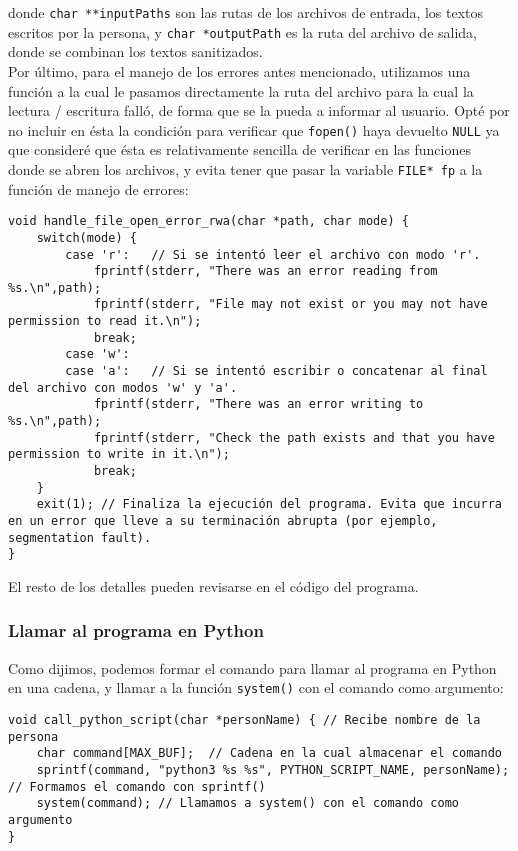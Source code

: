 \documentclass[a4paper]{article}
\begin{document}
\noindent donde \texttt{char **inputPaths} son las rutas de los archivos de entrada, los textos escritos por la persona, y \texttt{char *outputPath} es la ruta del archivo de salida, donde se combinan los textos sanitizados. \\

Por último, para el manejo de los errores antes mencionado, utilizamos una función a la cual le pasamos directamente la ruta del archivo para la cual la lectura / escritura falló, de forma que se la pueda a informar al usuario. Opté por no incluir en ésta la condición para verificar que \texttt{fopen()} haya devuelto \texttt{NULL} ya que consideré que ésta es relativamente sencilla de verificar en las funciones donde se abren los archivos, y evita tener que pasar la variable \texttt{FILE* fp} a la función de manejo de errores:

\begin{verbatim}
void handle_file_open_error_rwa(char *path, char mode) {
    switch(mode) {
        case 'r':   // Si se intentó leer el archivo con modo 'r'.
            fprintf(stderr, "There was an error reading from %s.\n",path);
            fprintf(stderr, "File may not exist or you may not have permission to read it.\n");
            break;
        case 'w':
        case 'a':   // Si se intentó escribir o concatenar al final del archivo con modos 'w' y 'a'.
            fprintf(stderr, "There was an error writing to %s.\n",path);
            fprintf(stderr, "Check the path exists and that you have permission to write in it.\n");
            break;
    }
    exit(1); // Finaliza la ejecución del programa. Evita que incurra en un error que lleve a su terminación abrupta (por ejemplo, segmentation fault).
}
\end{verbatim}

El resto de los detalles pueden revisarse en el código del programa.

\subsubsection{Llamar al programa en Python}

Como dijimos, podemos formar el comando para llamar al programa en Python en una cadena, y llamar a la función \texttt{system()} con el comando como argumento:

\begin{verbatim}
void call_python_script(char *personName) { // Recibe nombre de la persona
    char command[MAX_BUF];  // Cadena en la cual almacenar el comando
    sprintf(command, "python3 %s %s", PYTHON_SCRIPT_NAME, personName); // Formamos el comando con sprintf()
    system(command); // Llamamos a system() con el comando como argumento
}
\end{verbatim}
\end{document}
